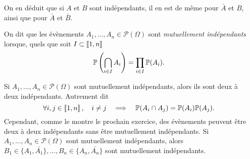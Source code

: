 \documentclass{magnolia}
\begin{document}
\begin{remarqueUnique}
\remarque On en déduit que si $A$ et $B$ sont indépendants, il en est de même pour $\bar{A}$ et $B$,
 ainsi que pour $\bar{A}$ et $\bar{B}$.
\end{remarqueUnique}

\begin{definition}
On dit que les évènements
$A_1,\ldots,A_n\in\mathcal{P}(\Omega)$ sont \emph{mutuellement indépendants} lorsque,
quels que soit $I\subset\left\llbracket 1,n\right\rrbracket$
\[\mathbb{P}\left(\bigcap_{i\in I} A_i\right)=\prod_{i\in I} \mathbb{P}(A_i).\]
\end{definition}

\begin{remarques}
\remarque Si $A_1,\ldots,A_n\in\mathcal{P}(\Omega)$ sont mutuellement indépendants, alors
  ils sont deux à deux indépendants. Autrement dit
  \[\forall i,j\in\left\llbracket 1,n\right\rrbracket,\quad i\neq j \quad\Longrightarrow\quad \mathbb{P}(A_i\cap A_j)
    =\mathbb{P}(A_i)\mathbb{P}(A_j).\]
  Cependant, comme le montre le prochain exercice, des évènements peuvent être deux à deux
  indépendants sans être mutuellement indépendants.
\remarque Si $A_1,\ldots,A_n\in\mathcal{P}(\Omega)$ sont mutuellement indépendants, alors
  $B_1\in\{A_1,\bar{A_1}\},\ldots,B_n\in\{A_n,\bar{A_n}\}$ sont mutuellement indépendants.
\end{remarques}
\end{document}
